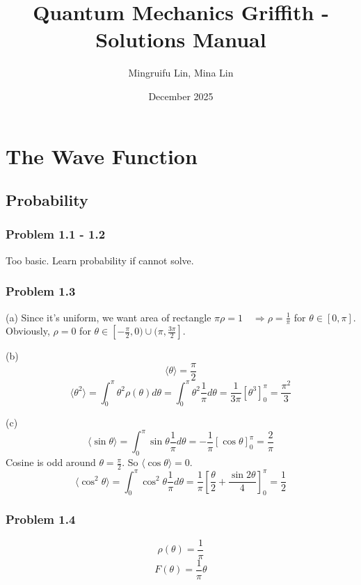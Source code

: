 \documentclass{book}
\title{Quantum Mechanics Griffith - Solutions Manual}
\author{Mingruifu Lin, Mina Lin}
\date{December 2025}
\begin{document}
\maketitle

\tableofcontents

\chapter{The Wave Function}

\section*{Probability}

\subsection*{Problem 1.1 - 1.2}
Too basic. Learn probability if cannot solve.

\subsection*{Problem 1.3}
(a)
Since it's uniform, we want area of rectangle $\pi \rho = 1 \quad \Rightarrow \rho = \frac{1}{\pi}$ for $\theta \in [0, \pi]$. Obviously, $\rho = 0$ for $\theta \in [-\frac{\pi}{2}, 0) \cup (\pi, \frac{3\pi}{2}]$.

\noindent
(b)
$$\langle \theta \rangle = \frac{\pi}{2}$$
$$\langle \theta^2 \rangle = \int_0^\pi \theta^2 \rho(\theta) d\theta = \int_0^\pi \theta^2 \frac{1}{\pi} d\theta = \frac{1}{3\pi} \left[ \theta^3 \right]_0^\pi = \frac{\pi^2}{3}$$

\noindent
(c)
$$\langle \sin \theta \rangle = \int_0^\pi \sin \theta \frac{1}{\pi} d\theta = -\frac{1}{\pi} \left[ \cos \theta \right]_0^\pi = \frac{2}{\pi}$$
Cosine is odd around $\theta = \frac{\pi}{2}$. So $\langle \cos \theta \rangle = 0$.
$$\langle \cos^2 \theta \rangle = \int_0^\pi \cos^2 \theta \frac{1}{\pi} d\theta = \frac{1}{\pi} \left[ \frac{\theta}{2} + \frac{\sin 2\theta}{4} \right]_0^\pi = \frac{1}{2}$$

\subsection*{Problem 1.4}
$$\rho(\theta) = \frac{1}{\pi}$$
$$F(\theta) = \frac{1}{\pi} \theta$$
\end{document}
